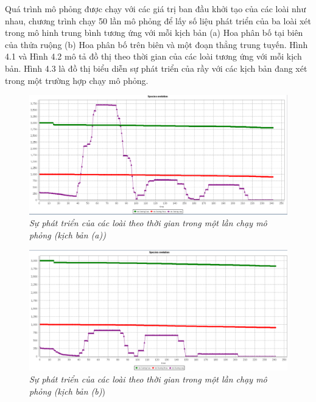 \documentclass[13pt]{extreport}
\begin{document}
{Quá trình mô phỏng được chạy với các giá trị ban đầu khởi tạo của các loài như nhau, chương trình chạy 50 lần mô phỏng để lấy số liệu phát triển của ba loài xét trong mô hinh trung bình tương ứng với mỗi kịch bản (a) Hoa phân bố tại biên của thửa ruộng (b) Hoa phân bố trên biên và một đoạn thẳng trung tuyến. Hình 4.1 và Hình 4.2 mô tả đồ thị theo thời gian của các loài tương ứng với mỗi kịch bản. Hình 4.3 là đồ thị biểu diễn sự phát triển của rầy với các kịch bản đang xét trong một trường hợp chạy mô phỏng.

\begin{figure}%
\begin{center}
\includegraphics[scale=0.4]{kb2gr}
\end{center}
\caption{\textit{Sự phát triển của các loài theo thời gian trong một lần chạy mô phỏng (kịch bản (a))}}
\end{figure}

\begin{figure}%
\begin{center}
\includegraphics[scale=0.4]{kb3gr}
\end{center}
\caption{\textit{Sự phát triển của các loài theo thời gian trong một lần chạy mô phỏng (kịch bản (b)}) }
\end{figure}

}
\end{document}
